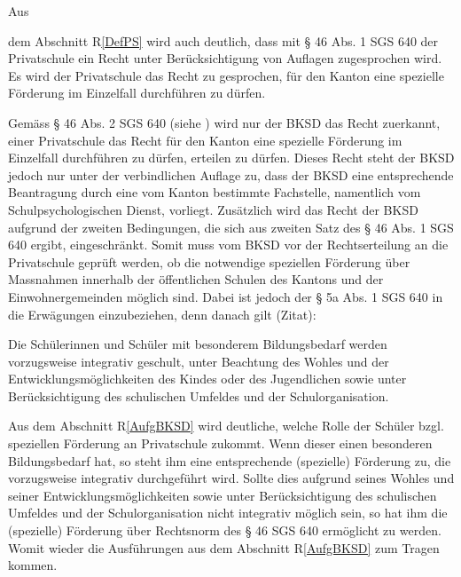 \documentclass[10pt,parskip]{scrbook}
\newcounter{rz}
\newcommand{\Rz}{\addtocounter{rz}{1}\marginpar{\texttt{\textit{A\arabic{rz}}}}}
\newcommand{\RzLabel}[1]{\refstepcounter{rz}\label{#1}\marginpar{\texttt{\textit{A\arabic{rz}}}}}
\begin{document}
Aus \Rz dem Abschnitt R\ref{DefPS} wird auch deutlich, dass mit § 46 Abs. 1 SGS 640 der Privatschule ein Recht unter Berücksichtigung von Auflagen zugesprochen wird. Es wird der Privatschule das Recht zu gesprochen, für den Kanton eine spezielle Förderung im Einzelfall durchführen zu dürfen. 

Gemäss \RzLabel{AufgBKSD} § 46 Abs. 2 SGS 640 (siehe \cite{SGS640}) wird nur der BKSD das Recht zuerkannt, einer Privatschule das Recht für den Kanton eine spezielle Förderung im Einzelfall durchführen zu dürfen, erteilen zu dürfen. Dieses Recht steht der BKSD jedoch nur unter der verbindlichen Auflage zu, dass der BKSD eine entsprechende Beantragung durch eine vom Kanton bestimmte Fachstelle, namentlich vom Schulpsychologischen Dienst, vorliegt. Zusätzlich wird das Recht der BKSD aufgrund der zweiten Bedingungen, die sich aus zweiten Satz des § 46 Abs. 1 SGS 640 ergibt, eingeschränkt. Somit muss vom BKSD vor der Rechtserteilung an die Privatschule geprüft werden, ob die notwendige speziellen Förderung über Massnahmen innerhalb der öffentlichen Schulen des Kantons und der Einwohnergemeinden möglich sind. Dabei ist jedoch der § 5a Abs. 1 SGS 640 in die Erwägungen einzubeziehen, denn danach gilt (Zitat):
\begin{addmargin}[2.5em]{0em}Die Schülerinnen und Schüler mit besonderem Bildungsbedarf werden vorzugsweise integrativ geschult, unter Beachtung des Wohles und der Entwicklungsmöglichkeiten des Kindes oder des Jugendlichen sowie unter Berücksichtigung des schulischen Umfeldes und der Schulorganisation.
\end{addmargin}

Aus \RzLabel{RechtSus}dem Abschnitt R\ref{AufgBKSD} wird deutliche, welche  Rolle der Schüler bzgl. speziellen Förderung an Privatschule zukommt. Wenn dieser einen besonderen Bildungsbedarf hat, so steht ihm eine entsprechende (spezielle) Förderung zu, die vorzugsweise integrativ durchgeführt wird. Sollte dies aufgrund seines Wohles und seiner Entwicklungsmöglichkeiten sowie unter Berücksichtigung des schulischen Umfeldes und der Schulorganisation nicht integrativ möglich sein, so hat ihm die (spezielle) Förderung über Rechtsnorm des § 46 SGS 640 ermöglicht zu werden. Womit wieder die Ausführungen aus dem Abschnitt R\ref{AufgBKSD} zum Tragen kommen.
\end{document}
